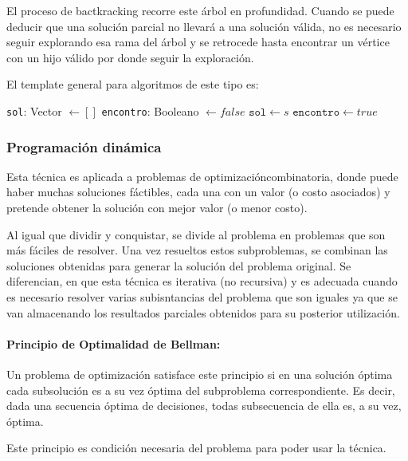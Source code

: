 El proceso de bactkracking recorre este árbol en profundidad. Cuando se puede deducir que una solución parcial no llevará a una solución válida, no es necesario seguir explorando esa rama del árbol y se retrocede hasta encontrar un vértice con un hijo válido por donde seguir la exploración. 

El template general para algoritmos de este tipo es: 

\begin{algorithmic}
	\State \texttt{sol}: Vector \(\gets [] \)
	\State \texttt{encontro}: Booleano \(\gets false \)
	\State\(\texttt{sol} \gets s\)
	\State \(\texttt{encontro} \gets true\)
	\Else
	~\Return
	\EndIf
	\EndFor
	\EndIf
	\EndFunction
\end{algorithmic}

\subsubsection{Programación dinámica}
Esta técnica es aplicada a problemas de optimizacióncombinatoria, donde puede haber muchas soluciones fáctibles, cada una con un valor (o costo asociados) y pretende obtener la solución con mejor valor (o menor costo).

Al igual que dividir y conquistar, se divide al problema en problemas que son más fáciles de resolver. Una vez resueltos estos subproblemas, se combinan las soluciones obtenidas para generar la solución del problema original. Se diferencian, en que esta técnica es iterativa (no recursiva) y es adecuada cuando es necesario resolver varias subisntancias del problema que son iguales ya que se van almacenando los resultados parciales obtenidos para su posterior utilización.

\paragraph{Principio de Optimalidad de Bellman:} Un problema de optimización satisface este principio si en una solución óptima cada subsolución es a su vez óptima del subproblema correspondiente. Es decir, dada una secuencia óptima de decisiones, todas subsecuencia de ella es, a su vez, óptima.

Este principio es condición necesaria del problema para poder usar la técnica. 

